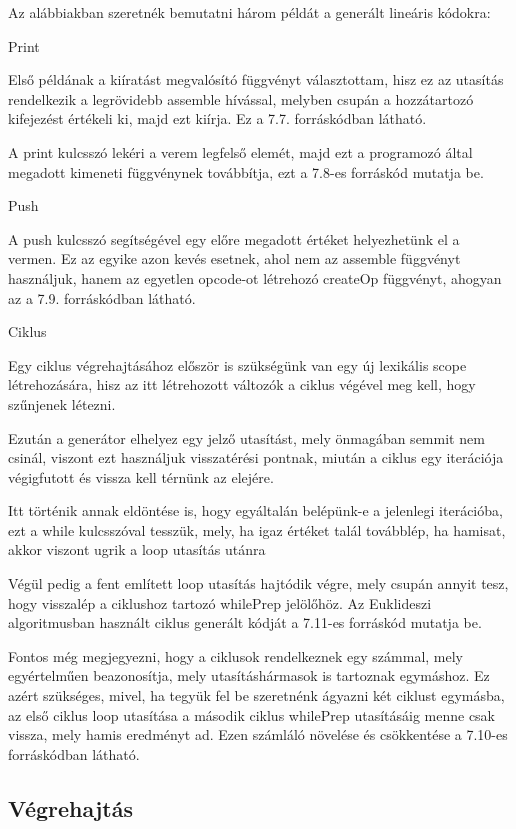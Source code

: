 Az alábbiakban szeretnék bemutatni három példát a generált lineáris kódokra:

Print

Első példának a kiíratást megvalósító függvényt választottam, hisz ez az utasítás rendelkezik a legrövidebb assemble hívással, melyben csupán a hozzátartozó kifejezést értékeli ki, majd ezt kiírja. Ez a 7.7. forráskódban látható.

A print kulcsszó lekéri a verem legfelső elemét, majd ezt a programozó által megadott kimeneti függvénynek továbbítja, ezt a 7.8-es forráskód mutatja be. 

Push

A push kulcsszó segítségével egy előre megadott értéket helyezhetünk el a vermen. Ez az egyike azon kevés esetnek, ahol nem az assemble függvényt használjuk, hanem az egyetlen opcode-ot létrehozó createOp függvényt, ahogyan az a 7.9. forráskódban látható.

Ciklus

Egy ciklus végrehajtásához először is szükségünk van egy új lexikális scope létrehozására, hisz az itt létrehozott változók a ciklus végével meg kell, hogy szűnjenek létezni.

Ezután a generátor elhelyez egy jelző utasítást, mely önmagában semmit nem csinál, viszont ezt használjuk visszatérési pontnak, miután a ciklus egy iterációja végigfutott és vissza kell térnünk az elejére.

Itt történik annak eldöntése is, hogy egyáltalán belépünk-e a jelenlegi iterációba, ezt a while kulcsszóval tesszük, mely, ha igaz értéket talál továbblép, ha hamisat, akkor viszont ugrik a loop utasítás utánra 

Végül pedig a fent említett loop utasítás hajtódik végre, mely csupán annyit tesz, hogy visszalép a ciklushoz tartozó whilePrep jelölőhöz. Az Euklideszi algoritmusban használt ciklus generált kódját a 7.11-es forráskód mutatja be.

Fontos még megjegyezni, hogy a ciklusok rendelkeznek egy számmal, mely egyértelműen beazonosítja, mely utasításhármasok is tartoznak egymáshoz. Ez azért szükséges, mivel, ha tegyük fel be szeretnénk ágyazni két ciklust egymásba, az első ciklus loop utasítása a második ciklus whilePrep utasításáig menne csak vissza, mely hamis eredményt ad. Ezen számláló növelése és csökkentése a 7.10-es forráskódban látható.

\subsection{Végrehajtás}

